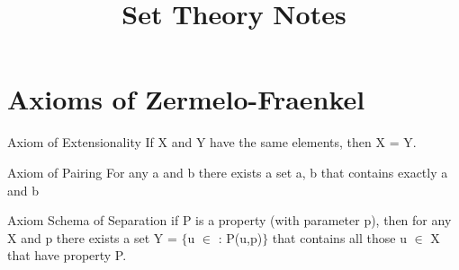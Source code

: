 \documentclass[10pt,a4paper]{article}
\title{Set Theory Notes}
\begin{document}
\maketitle
\tableofcontents
\newpage

\section{Axioms of Zermelo-Fraenkel}
\begin{axiom}{Axiom of Extensionality}
	If X and Y have the same elements, then X = Y.
\end{axiom}

\begin{axiom}{Axiom of Pairing}
	For any a and b there exists a set {a, b} that contains exactly a and b
\end{axiom}

\begin{axiom}{Axiom Schema of Separation}
	if P is a property (with parameter p), then for any X and p there exists a set Y = $\lbrace$u $\in$ : P(u,p)$\rbrace$ that contains all those u $\in$ X that have property P.
\end{axiom}
\end{document}
